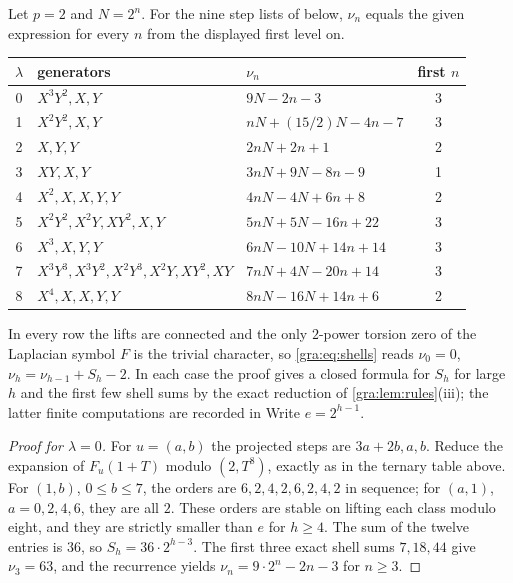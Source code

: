 \begin{theorem}\label{gra:thm:kataoka}
Let $p=2$ and $N=2^n$. For the nine step lists of
\cite[Table~7]{Kataoka2026Iwasawa} below, $\nu_n$ equals the given
expression for every $n$ from the displayed first level on.
\begin{center}\small\upshape
\begin{tabular}{cllc}
\toprule
$\lambda$ & generators & $\nu_n$ & first $n$\\
\midrule
0 & $X^3Y^2,X,Y$ & $9N-2n-3$ & 3\\
1 & $X^2Y^2,X,Y$ & $nN+(15/2)N-4n-7$ & 3\\
2 & $X,Y,Y$ & $2nN+2n+1$ & 2\\
3 & $XY,X,Y$ & $3nN+9N-8n-9$ & 1\\
4 & $X^2,X,X,Y,Y$ & $4nN-4N+6n+8$ & 2\\
5 & $X^2Y^2,X^2Y,XY^2,X,Y$ & $5nN+5N-16n+22$ & 3\\
6 & $X^3,X,Y,Y$ & $6nN-10N+14n+14$ & 3\\
7 & $X^3Y^3,X^3Y^2,X^2Y^3,X^2Y,XY^2,XY$ & $7nN+4N-20n+14$ & 3\\
8 & $X^4,X,X,Y,Y$ & $8nN-16N+14n+6$ & 2\\
\bottomrule
\end{tabular}
\end{center}
\end{theorem}

In every row the lifts are connected and the only $2$-power torsion zero of
the Laplacian symbol $F$ is the trivial character, so
\eqref{gra:eq:shells} reads $\nu_0=0$, $\nu_h=\nu_{h-1}+S_h-2$. In each
case the proof gives a closed formula for $S_h$ for large $h$ and the first
few shell sums by the exact reduction of \cref{gra:lem:rules}(iii); the
latter finite computations are recorded in
Write $e=2^{h-1}$.

\begin{proof}[Proof for $\lambda=0$]
For $u=(a,b)$ the projected steps are $3a+2b,a,b$. Reduce the expansion of
$F_u(1+T)$ modulo $(2,T^8)$, exactly as in the ternary table above. For
$(1,b)$, $0\le b\le7$, the orders are $6,2,4,2,6,2,4,2$ in sequence; for
$(a,1)$, $a=0,2,4,6$, they are all $2$. These orders are stable on lifting
each class modulo eight, and they are strictly smaller than $e$ for
$h\ge4$. The sum of the twelve entries is $36$, so $S_h=36\cdot2^{h-3}$.
The first three exact shell sums $7,18,44$ give $\nu_3=63$, and the
recurrence yields $\nu_n=9\cdot2^n-2n-3$ for $n\ge3$.
\end{proof}

